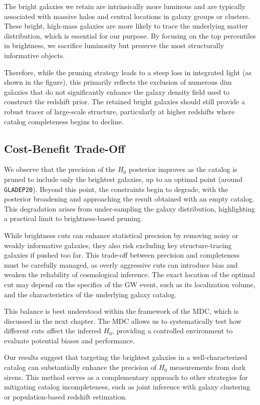 The bright galaxies we retain are intrinsically more luminous and are typically associated with massive halos and central locations in galaxy groups or clusters. These bright, high-mass galaxies are more likely to trace the underlying matter distribution, which is essential for our purpose. By focusing on the top percentiles in brightness, we sacrifice luminosity but preserve the most structurally informative objects.

Therefore, while the pruning strategy leads to a steep loss in integrated light (as shown in the figure), this primarily reflects the exclusion of numerous dim galaxies that do not significantly enhance the galaxy density field used to construct the redshift prior. The retained bright galaxies should still provide a robust tracer of large-scale structure, particularly at higher redshifts where catalog completeness begins to decline.

\subsection{Cost-Benefit Trade-Off}
We observe that the precision of the $H_0$ posterior improves as the catalog is pruned to include only the brightest galaxies, up to an optimal point (around \texttt{GLADEP20}). Beyond this point, the constraints begin to degrade, with the posterior broadening and approaching the result obtained with an empty catalog. This degradation arises from under-sampling the galaxy distribution, highlighting a practical limit to brightness-based pruning.

While brightness cuts can enhance statistical precision by removing noisy or weakly informative galaxies, they also risk excluding key structure-tracing galaxies if pushed too far. This trade-off between precision and completeness must be carefully managed, as overly aggressive cuts can introduce bias and weaken the reliability of cosmological inference. The exact location of the optimal cut may depend on the specifics of the GW event, such as its localization volume, and the characteristics of the underlying galaxy catalog.

This balance is best understood within the framework of the \acf{MDC}, which is discussed in the next chapter. The \ac{MDC} allows us to systematically test how different cuts affect the inferred $H_0$, providing a controlled environment to evaluate potential biases and performance.

Our results suggest that targeting the brightest galaxies in a well-characterized catalog can substantially enhance the precision of $H_0$ measurements from dark sirens. This method serves as a complementary approach to other strategies for mitigating catalog incompleteness, such as joint inference with galaxy clustering or population-based redshift estimation.